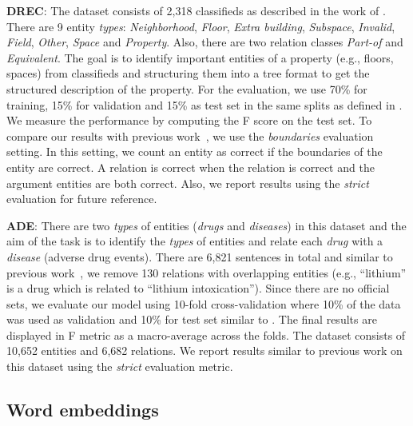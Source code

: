 \documentclass[review]{elsarticle}
\newcommand{\eg}{e.g., }
\begin{document}
\noindent \textbf{DREC}: The dataset consists of 
2,318 classifieds as described in the work of \cite{bekoulis:18}. There are 9 entity \emph{types}: \emph{Neighborhood}, \emph{Floor}, \emph{Extra building}, \emph{Subspace}, \emph{Invalid}, \emph{Field}, \emph{Other}, \emph{Space} and \emph{Property}. Also, there are two relation classes \emph{Part-of} and \emph{Equivalent}. The goal is to  identify important
entities of a property (\eg floors, spaces) from classifieds and structuring them
into a tree format to get the structured description of the property. 
For the evaluation,
we use 70\% for training, 15\% for validation and 15\% as test set in the same splits as defined in \cite{bekoulis:18}. We measure
the performance by computing the F score on the test set. To compare our results with previous work~\citep{bekoulis:18}, we use the \emph{boundaries} evaluation setting. In this setting, we count an entity as correct if the boundaries of the entity are correct. A relation is correct when the relation is correct and the argument entities are both correct. Also, we report results using the \emph{strict} evaluation for future reference. 

\noindent \textbf{ADE}: There are two \emph{types} of entities (\emph{drugs} and \emph{diseases}) in this dataset and the aim of the task is to identify the \emph{types} of entities and relate each \emph{drug} with a \emph{disease} (adverse drug events).
There are 6,821 sentences in total and similar to previous work~\citep{li:16,li:17}, we remove 130 relations with overlapping entities (\eg ``lithium'' is a drug which is related to ``lithium intoxication''). Since there are no official sets, we evaluate our model using 10-fold cross-validation where 10\% of the data was used as validation and 10\% for test set similar to \cite{li:17}. The final results are displayed in F metric as a macro-average across the folds. The dataset consists of 10,652 entities and 6,682 relations. We report results similar to previous work on this dataset using the \emph{strict} evaluation metric.



\subsection{Word embeddings}
\end{document}

